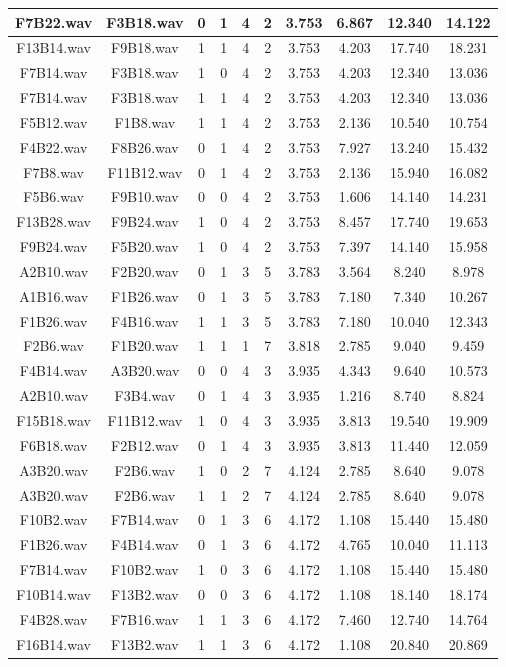 \documentclass[11pt,a4paper]{book}
\begin{document}
\begin{longtable}[c]{|c|c|c|c|c|c|c|c|c|c|}
F7B22.wav&F3B18.wav&0&1&4&2&3.753&6.867&12.340&14.122\\ \hline
F13B14.wav&F9B18.wav&1&1&4&2&3.753&4.203&17.740&18.231\\ \hline
F7B14.wav&F3B18.wav&1&0&4&2&3.753&4.203&12.340&13.036\\ \hline
F7B14.wav&F3B18.wav&1&1&4&2&3.753&4.203&12.340&13.036\\ \hline
F5B12.wav&F1B8.wav&1&1&4&2&3.753&2.136&10.540&10.754\\ \hline
F4B22.wav&F8B26.wav&0&1&4&2&3.753&7.927&13.240&15.432\\ \hline
F7B8.wav&F11B12.wav&0&1&4&2&3.753&2.136&15.940&16.082\\ \hline
F5B6.wav&F9B10.wav&0&0&4&2&3.753&1.606&14.140&14.231\\ \hline
F13B28.wav&F9B24.wav&1&0&4&2&3.753&8.457&17.740&19.653\\ \hline
F9B24.wav&F5B20.wav&1&0&4&2&3.753&7.397&14.140&15.958\\ \hline
A2B10.wav&F2B20.wav&0&1&3&5&3.783&3.564&8.240&8.978\\ \hline
A1B16.wav&F1B26.wav&0&1&3&5&3.783&7.180&7.340&10.267\\ \hline
F1B26.wav&F4B16.wav&1&1&3&5&3.783&7.180&10.040&12.343\\ \hline
F2B6.wav&F1B20.wav&1&1&1&7&3.818&2.785&9.040&9.459\\ \hline
F4B14.wav&A3B20.wav&0&0&4&3&3.935&4.343&9.640&10.573\\ \hline
A2B10.wav&F3B4.wav&0&1&4&3&3.935&1.216&8.740&8.824\\ \hline
F15B18.wav&F11B12.wav&1&0&4&3&3.935&3.813&19.540&19.909\\ \hline
F6B18.wav&F2B12.wav&0&1&4&3&3.935&3.813&11.440&12.059\\ \hline
A3B20.wav&F2B6.wav&1&0&2&7&4.124&2.785&8.640&9.078\\ \hline
A3B20.wav&F2B6.wav&1&1&2&7&4.124&2.785&8.640&9.078\\ \hline
F10B2.wav&F7B14.wav&0&1&3&6&4.172&1.108&15.440&15.480\\ \hline
F1B26.wav&F4B14.wav&0&1&3&6&4.172&4.765&10.040&11.113\\ \hline
F7B14.wav&F10B2.wav&1&0&3&6&4.172&1.108&15.440&15.480\\ \hline
F10B14.wav&F13B2.wav&0&0&3&6&4.172&1.108&18.140&18.174\\ \hline
F4B28.wav&F7B16.wav&1&1&3&6&4.172&7.460&12.740&14.764\\ \hline
F16B14.wav&F13B2.wav&1&1&3&6&4.172&1.108&20.840&20.869\\ \hline

\end{longtable}
\end{document}
